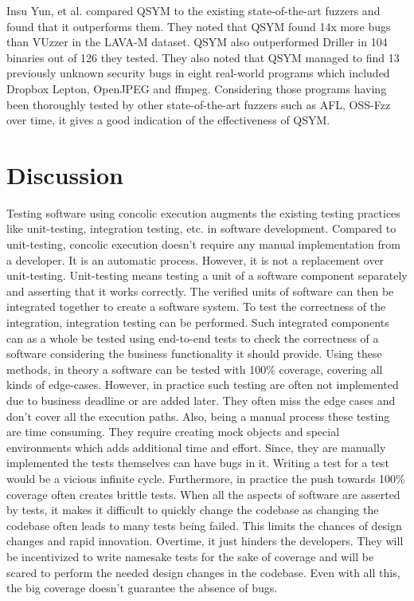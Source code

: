 \documentclass[ runningheads,
               a4paper]{llncs}
\begin{document}
Insu Yun, et al. compared QSYM \cite{yun2018qsym} to the existing state-of-the-art fuzzers and found that it outperforms them. They noted that QSYM found 14x more bugs than VUzzer in the LAVA-M dataset. QSYM also outperformed Driller in 104 binaries out of 126 they tested. They also noted that QSYM managed to find 13 previously unknown security bugs in eight real-world programs which included Dropbox Lepton, OpenJPEG and ffmpeg. Considering those programs having been thoroughly tested by other state-of-the-art fuzzers such as AFL, OSS-Fzz over time, it gives a good indication of the effectiveness of QSYM.






\section{Discussion}


Testing software using concolic execution augments the existing testing practices like unit-testing, integration testing, etc. in software development. Compared to unit-testing, concolic execution doesn't require any manual implementation from a developer. It is an automatic process. However, it is not a replacement over unit-testing. Unit-testing means testing a unit of a software component separately and asserting that it works correctly. The verified units of software can then be integrated together to create a software system. To test the correctness of the integration, integration testing can be performed. Such integrated components can as a whole be tested using end-to-end tests to check the correctness of a software considering the business functionality it should provide. Using these methods, in theory a software can be tested with 100\% coverage, covering all kinds of edge-cases. However, in practice such testing are often not implemented due to business deadline or are added later. They often miss the edge cases and don't cover all the execution paths.  Also, being a manual process these testing are time consuming. They require creating mock objects and special environments which adds additional time and effort. Since, they are manually implemented the tests themselves can have bugs in it. Writing a test for a test would be a vicious infinite cycle. Furthermore, in practice the push towards 100\% coverage often creates brittle tests. When all the aspects of software are asserted by tests, it makes it difficult to quickly change the codebase as changing the codebase often leads to many tests being failed. This limits the chances of design changes and rapid innovation. Overtime, it just hinders the developers. They will be incentivized to write namesake tests for the sake of coverage and will be scared to perform the needed design changes in the codebase. Even with all this, the big coverage doesn't guarantee the absence of bugs.
\end{document}
